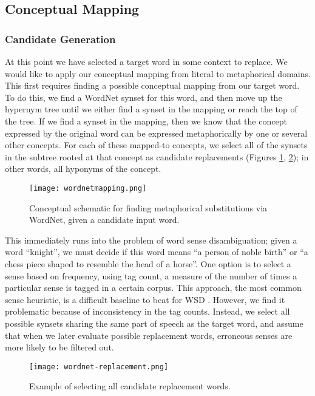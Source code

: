 \documentclass[12pt]{article}
\begin{document}
\subsection{Conceptual Mapping}

\subsubsection{Candidate Generation}

At this point we have selected a target word in some context to replace. We would like to apply our conceptual mapping from literal to metaphorical domains. This first requires finding a possible conceptual mapping from our target word. To do this, we find a WordNet synset for this word, and then move up the hypernym tree until we either find a synset in the mapping or reach the top of the tree. If we find a synset in the mapping, then we know that the concept expressed by the original word can be expressed metaphorically by one or several other concepts. For each of these mapped-to concepts, we select all of the synsets in the subtree rooted at that concept as candidate replacements (Figures \ref{fig:wnmapping}, \ref{fig:wnmapexample}); in other words, all hyponyms of the concept.

\begin{figure}[h]
	\centering
	\texttt{[image: wordnetmapping.png]}
	\caption{Conceptual schematic for finding metaphorical substitutions via WordNet, given a candidate input word.}
	\label{fig:wnmapping}
\end{figure}

This immediately runs into the problem of word sense disambiguation; given a word ``knight'', we must decide if this word means ``a person of noble birth'' or ``a chess piece shaped to resemble the head of a horse''. One option is to select a sense based on frequency, using tag count, a measure of the number of times a particular sense is tagged in a certain corpus. This approach, the most common sense heuristic, is a difficult baseline to beat for WSD \cite{mccarthy}. However, we find it problematic because of inconsistency in the tag counts. Instead, we select all possible synsets sharing the same part of speech as the target word, and assume that when we later evaluate possible replacement words, erroneous senses are more likely to be filtered out.

\begin{figure}[h]
	\centering
	\texttt{[image: wordnet-replacement.png]}
	\caption{Example of selecting all candidate replacement words.}
	\label{fig:wnmapexample}
\end{figure}
\end{document}
